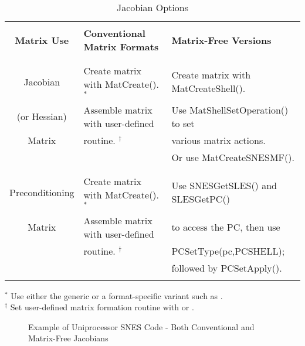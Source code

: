 \begin{center}
\begin{table}[H]
\begin{tabular}{|c|l|l|} \hline
& & \\
{\bf Matrix Use}      & {\bf Conventional Matrix Formats}          & {\bf Matrix-Free Versions}\\ 
& & \\ \hline
& & \\
Jacobian        & Create matrix with MatCreate(). $ ^* $ & Create matrix with MatCreateShell().\\
(or Hessian)    & Assemble matrix with user-defined     & Use MatShellSetOperation() to set\\
Matrix          & routine. $ ^\dagger $                         & various matrix actions.\\
                &                                    & Or use MatCreateSNESMF().\\
& & \\ \hline
& & \\
Preconditioning  & Create matrix with MatCreate(). $ ^* $ & Use SNESGetSLES() and SLESGetPC() \\
Matrix           & Assemble matrix with user-defined & to access the PC, then use\\
                & routine. $ ^\dagger $         & PCSetType(pc,PCSHELL);\\ 
                &             & followed by PCSetApply(). \\

& & \\ \hline
\end{tabular}

\medskip
$ ^* $ Use either the generic  or a format-specific variant
   such as .\\
$ ^\dagger $ Set user-defined matrix formation routine with  or
   .
\medskip
\caption{Jacobian Options}
\label{tab:jacobians}
\end{table}
\end{center}

\begin{figure}[H]
{\small
{}
}
\caption{Example of Uniprocessor SNES Code - Both Conventional and Matrix-Free Jacobians}
\label{fig:snesexample2}
\end{figure} 

